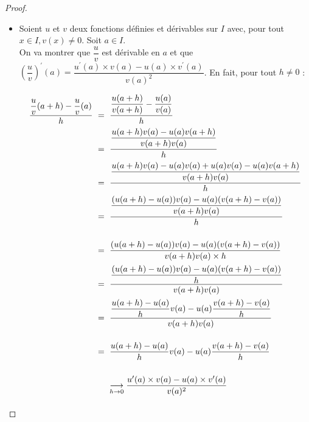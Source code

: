\documentclass[12pt]{article}
\theoremstyle{break}
\begin{document}
\begin{proof}
\begin{itemize}
\begin{equation*}\arraycolsep=3pt\def\arraystretch{2}
  \begin{array}{rcl}
    \dfrac{u v(a+h)-u v(a)}{h} & = & \dfrac{u(a+h) v(a+h)-u(a) v(a)}{h} \\
    & = & \dfrac{u(a+h) v(a+h)-u(a) v(a+h)+u(a) \times v(a+h)-u(a) v(a)}{h} \\
    & = & \dfrac{(u(a+h)-u(a)) \times v(a+h)+u(a) \times(v(a+h)-v(a))}{h} \\
    & = & \dfrac{u(a+h)-u(a)}{h} \times v(a+h)+u(a) \times \dfrac{v(a+h)-v(a)}{h} \\
    & & \underset{h \rightarrow 0}{\longrightarrow} u^{\prime}(a) \times v(a)+u(a) \times v^{\prime}(a)
  \end{array}
\end{equation*}
\newpage
  \item Soient $u$ et $v$ deux fonctions définies et dérivables sur $I$ avec, pour tout $x \in I, v(x) \neq 0$. Soit $a \in I$.\\
  On va montrer que $\dfrac{u}{v}$ est dérivable en $a$ et que $\left(\dfrac{u}{v}\right)^{\prime}(a)=\dfrac{u^{\prime}(a) \times v(a)-u(a) \times v^{\prime}(a)}{v(a)^{2}}$. En fait, pour tout $h \neq 0$ :

\begin{equation*}\arraycolsep=3pt\def\arraystretch{3.3}
  \begin{array}{rcl}
    \dfrac{\dfrac{u}{v}(a+h)-\dfrac{u}{v}(a)}{h} & = & \dfrac{\dfrac{u(a+h)}{v(a+h)}-\dfrac{u(a)}{v(a)}}{h} \\
    & = & \dfrac{\dfrac{u(a+h) v(a)-u(a) v(a+h)}{v(a+h) v(a)}}{h} \\
    & = & \dfrac{\dfrac{u(a+h) v(a)-u(a) v(a)+u(a) v(a)-u(a) v(a+h)}{v(a+h) v(a)}}{h} \\
    & = & \dfrac{\dfrac{(u(a+h)-u(a)) v(a)-u(a)(v(a+h)-v(a))}{v(a+h) v(a)}}{h} \\
    & = & \dfrac{(u(a+h)-u(a)) v(a)-u(a)(v(a+h)-v(a))}{v(a+h) v(a) \times h} \\
    & = & \dfrac{\dfrac{(u(a+h)-u(a)) v(a)-u(a)(v(a+h)-v(a))}{h}}{v(a+h) v(a)} \\
    & = & \dfrac{\dfrac{u(a+h)-u(a)}{h}v(a)-u(a)\dfrac{v(a+h)-v(a)}{h}}{v(a+h) v(a)} \\
    & = & \dfrac{u(a+h)-u(a)}{h} v(a)-u(a) \dfrac{v(a+h)-v(a)}{h} \\
    & & \underset{h \rightarrow 0}{\longrightarrow} \dfrac{u'(a) \times v(a) - u(a) \times v'(a)}{v(a)^2}
  \end{array}
\end{equation*}


\end{itemize}
\end{proof}
\end{document}

